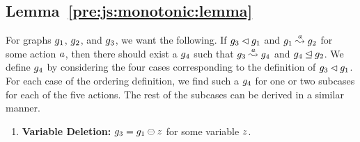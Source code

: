 \subsection*{Lemma~\ref{pre:js:monotonic:lemma}}
%
For graphs $g_1$, $g_2$, and $g_3$, 
we want the following.
%
If $g_3\lhd g_1$ and 
$g_1\stackrel{a}{\leadsto}g_2$ for 
some action $a$, 
then there should
exist a $g_4$ such that 
$g_3\stackrel{a}{\leadsto}g_4$ 
and
$g_4\unlhd g_2$.
%
We define $g_4$ by considering 
the four cases corresponding to the definition of
$g_3\lhd g_1$.
%
For each case of the ordering definition, 
we find such a $g_4$ for one or two subcases 
for each of the five actions.
%
The rest of the subcases can be derived in a similar manner.

\begin{enumerate}
\item {\bf Variable Deletion:}
$g_3=g_1\ominus{\ensuremath{z}}$ for
some variable $z$.


\end{enumerate}
